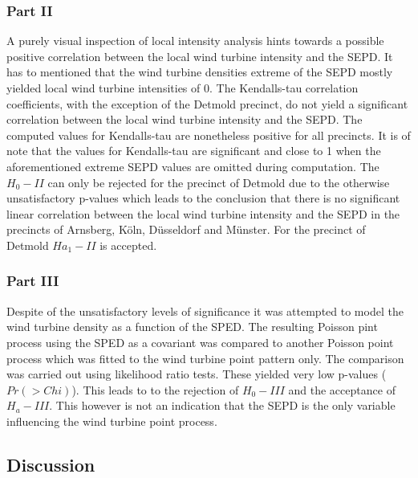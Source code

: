 \documentclass[
]{article}
\begin{document}
\hypertarget{part-ii}{%
\subsubsection{Part II}\label{part-ii}}

A purely visual inspection of local intensity analysis hints towards a
possible positive correlation between the local wind turbine intensity
and the SEPD. It has to mentioned that the wind turbine densities
extreme of the SEPD mostly yielded local wind turbine intensities of 0.
The Kendalls-tau correlation coefficients, with the exception of the
Detmold precinct, do not yield a significant correlation between the
local wind turbine intensity and the SEPD. The computed values for
Kendalls-tau are nonetheless positive for all precincts. It is of note
that the values for Kendalls-tau are significant and close to 1 when the
aforementioned extreme SEPD values are omitted during computation. The
\(H_{0} - II\) can only be rejected for the precinct of Detmold due to
the otherwise unsatisfactory p-values which leads to the conclusion that
there is no significant linear correlation between the local wind
turbine intensity and the SEPD in the precincts of Arnsberg, Köln,
Düsseldorf and Münster. For the precinct of Detmold \(Ha_{1} - II\) is
accepted.

\hypertarget{part-iii}{%
\subsubsection{Part III}\label{part-iii}}

Despite of the unsatisfactory levels of significance it was attempted to
model the wind turbine density as a function of the SPED. The resulting
Poisson pint process using the SPED as a covariant was compared to
another Poisson point process which was fitted to the wind turbine point
pattern only. The comparison was carried out using likelihood ratio
tests. These yielded very low p-values (\(Pr(>Chi)\)). This leads to to
the rejection of \(H_{0} - III\) and the acceptance of \(H_a - III\).
This however is not an indication that the SEPD is the only variable
influencing the wind turbine point process.

\hypertarget{discussion}{%
\subsection{Discussion}\label{discussion}}
\end{document}
